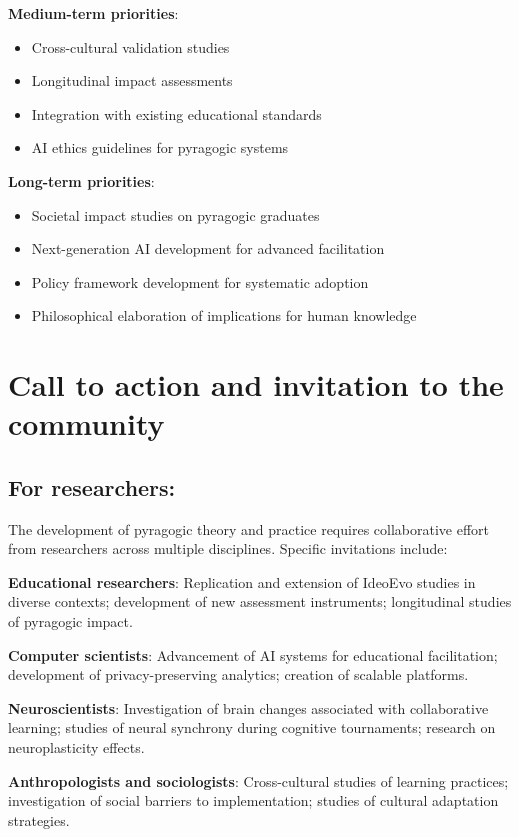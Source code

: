 \textbf{Medium-term priorities}:
\begin{itemize}
	\item Cross-cultural validation studies
	\item Longitudinal impact assessments
	\item Integration with existing educational standards
	\item AI ethics guidelines for pyragogic systems
\end{itemize}

\textbf{Long-term priorities}:
\begin{itemize}
	\item Societal impact studies on pyragogic graduates
	\item Next-generation AI development for advanced facilitation
	\item Policy framework development for systematic adoption
	\item Philosophical elaboration of implications for human knowledge
\end{itemize}

\section{Call to action and invitation to the community}
\subsection*{For researchers:}

The development of pyragogic theory and practice requires collaborative effort from researchers across multiple disciplines. Specific invitations include:

\textbf{Educational researchers}: Replication and extension of IdeoEvo studies in diverse contexts; development of new assessment instruments; longitudinal studies of pyragogic impact.

\textbf{Computer scientists}: Advancement of AI systems for educational facilitation; development of privacy-preserving analytics; creation of scalable platforms.

\textbf{Neuroscientists}: Investigation of brain changes associated with collaborative learning; studies of neural synchrony during cognitive tournaments; research on neuroplasticity effects.

\textbf{Anthropologists and sociologists}: Cross-cultural studies of learning practices; investigation of social barriers to implementation; studies of cultural adaptation strategies.

